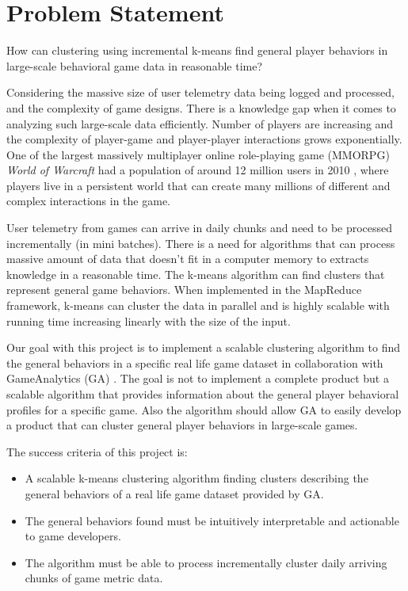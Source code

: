 \section{Problem Statement}

{\addtolength{\leftskip}{5mm} How can clustering using incremental k-means find general player behaviors in large-scale behavioral game data in reasonable time? \par}

Considering the massive size of user telemetry data being logged and processed, and the complexity of game designs. There is a knowledge gap when it comes to analyzing such large-scale data efficiently. Number of players are increasing and the complexity of player-game and player-player interactions grows exponentially. One of the largest massively multiplayer online role-playing game (MMORPG) \textit{World of Warcraft} had a population of around 12 million users in 2010 \citep{Thurau:2010WoW}, where players live in a persistent world that can create many millions of different and complex interactions in the game.

User telemetry from games can arrive in daily chunks and need to be processed incrementally (in mini batches). There is a need for algorithms that can process massive amount of data that doesn't fit in a computer memory to extracts knowledge in a reasonable time. The k-means algorithm can find clusters that represent general game behaviors. When implemented in the MapReduce framework, k-means can cluster the data in parallel and is highly scalable with running time increasing linearly with the size of the input. 

Our goal with this project is to implement a scalable clustering algorithm to find the general behaviors in a specific real life game dataset in collaboration with GameAnalytics (GA) \citep{GA2013}. The goal is not to implement a complete product but a scalable algorithm that provides information about the general player behavioral profiles for a specific game. Also the algorithm should allow GA to easily develop a product that can cluster general player behaviors in large-scale games.

The success criteria of this project is:
\begin{itemize}
\item A scalable k-means clustering algorithm finding clusters describing the general behaviors of a real life game dataset provided by GA.
\item The general behaviors found must be intuitively interpretable and actionable to game developers.
\item The algorithm must be able to process incrementally cluster daily arriving chunks of game metric data.
\end{itemize}

